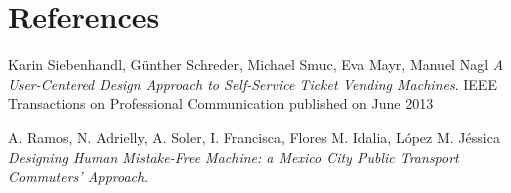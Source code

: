 \documentclass{article}
\begin{document}
\section{References}

\begin{enumerate}
Karin Siebenhandl, Günther Schreder, Michael Smuc, Eva Mayr, Manuel Nagl
\textit{A User-Centered Design Approach to Self-Service Ticket Vending Machines}. 
IEEE Transactions on Professional Communication published on June 2013

A. Ramos, N. Adrielly, A. Soler, I. Francisca, Flores M. Idalia, López M. Jéssica
\textit{Designing Human Mistake-Free Machine: a Mexico City Public Transport Commuters’ Approach}.
\end{enumerate}
\end{document}
